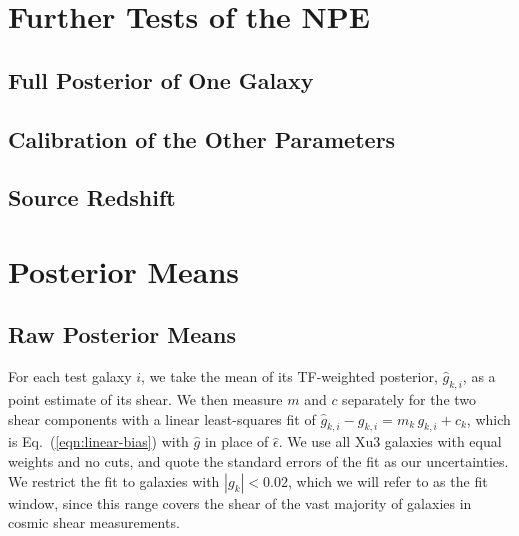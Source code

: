 \appendix

\section{Further Tests of the NPE}
\label{app:npe-tests}

\subsection{Full Posterior of One Galaxy}
\label{app:corner}


\subsection{Calibration of the Other Parameters}
\label{app:coverage}


\subsection{Source Redshift}
\label{app:redshift}


\section{Posterior Means}
\label{app:posterior-means}

\subsection{Raw Posterior Means}
\label{app:raw-bias}

For each test galaxy $i$, we take the mean of its TF-weighted posterior, $\hat{g}_{k,i}$, as a point estimate of its shear. We then measure $m$ and $c$ separately for the two shear components with a linear least-squares fit of $\hat{g}_{k,i} - g_{k,i} = m_k\, g_{k,i} + c_k$, which is Eq.~(\ref{eqn:linear-bias}) with $\hat{g}$ in place of $\hat{\epsilon}$. We use all Xu3 galaxies with equal weights and no cuts, and quote the standard errors of the fit as our uncertainties. We restrict the fit to galaxies with $|g_k| < 0.02$, which we will refer to as the fit window, since this range covers the shear of the vast majority of galaxies in cosmic shear measurements.

